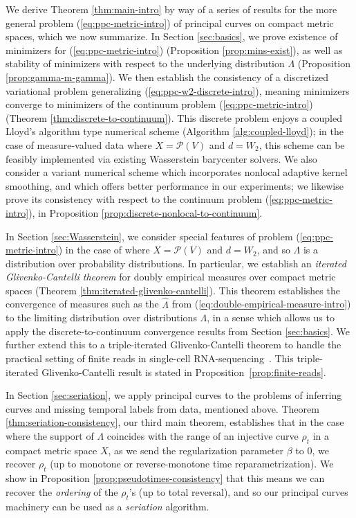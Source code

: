\documentclass[aos, preprint]{imsart}
\theoremstyle{plain}
\theoremstyle{remark}
\begin{document}
We derive Theorem \ref{thm:main-intro} by way of a series of results for the more general problem (\ref{eq:ppc-metric-intro}) of principal curves on compact metric spaces, which we now summarize.
In Section \ref{sec:basics}, we  prove existence of minimizers for (\ref{eq:ppc-metric-intro})  (Proposition \ref{prop:mins-exist}),  as well as stability of minimizers
with respect to the underlying distribution $\Lambda$ (Proposition \ref{prop:gamma-m-gamma}). We then establish the consistency
of a discretized variational problem generalizing (\ref{eq:ppc-w2-discrete-intro}), meaning minimizers converge to minimizers of the continuum problem (\ref{eq:ppc-metric-intro}) (Theorem \ref{thm:discrete-to-continuum}). This discrete problem enjoys a
\textquotedbl coupled Lloyd's algorithm\textquotedbl{} type numerical
scheme  (Algorithm \ref{alg:coupled-lloyd}); in the case of measure-valued data where $X=\mathcal{P}(V)$ and $d=W_2$, this scheme can be feasibly implemented via existing Wasserstein
barycenter solvers. We also consider a variant numerical scheme which incorporates nonlocal adaptive kernel smoothing, and which offers better performance in our experiments; we likewise prove its consistency with respect to the continuum problem (\ref{eq:ppc-metric-intro}), in Proposition \ref{prop:discrete-nonlocal-to-continuum}.

In Section \ref{sec:Wasserstein}, we consider special features of problem (\ref{eq:ppc-metric-intro}) in the case of where $X=\mathcal{P}(V)$ and $d=W_2$, and so $\Lambda$ is a distribution over probability distributions. In particular, we establish an \emph{iterated Glivenko-Cantelli theorem} for doubly empirical measures over compact metric spaces (Theorem \ref{thm:iterated-glivenko-cantelli}). This theorem establishes the convergence of measures such as the $\hat{\Lambda}$ from (\ref{eq:double-empirical-measure-intro}) to the limiting distribution over distributions $\Lambda$, in a sense which allows us to apply the discrete-to-continuum convergence results from Section \ref{sec:basics}.
We further extend this to a triple-iterated Glivenko-Cantelli theorem to handle the practical setting of finite  reads in single-cell RNA-sequencing~\cite{kim2024optimal, zhang2020determining}.
This  triple-iterated Glivenko-Cantelli result is stated in Proposition~\ref{prop:finite-reads}.


In Section \ref{sec:seriation}, we apply principal curves to the problems of inferring curves and missing
temporal labels from data, mentioned above. {Theorem \ref{thm:seriation-consistency},  our third main theorem, establishes that in the case where the support of $\Lambda$ coincides with the range of an injective curve $\rho_t$ in a compact metric space $X$, as we send the regularization parameter $\beta$ to 0, we recover $\rho_t$ (up to monotone or reverse-monotone time reparametrization).} We show in Proposition \ref{prop:pseudotimes-consistency} that this means we can recover the \emph{ordering} of the $\rho_t$'s (up to total reversal), and so our principal curves machinery can be used as a \emph{seriation} algorithm.
\end{document}
